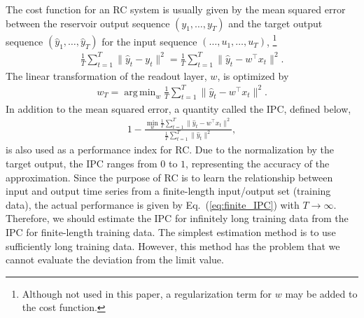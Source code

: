\documentclass{article}
\DeclareMathOperator*{\argmin}{arg\,min}
\begin{document}
The cost function for an RC system is usually given by the mean squared error between the reservoir output sequence $(y_1, \ldots, y_T)$ and the target output sequence $(\hat{y}_1, \ldots, \hat{y}_T)$ for the input sequence $(\ldots, u_1, \ldots, u_T)$, 
\footnote{Although not used in this paper, a regularization term for $w$ may be added to the cost function.}
\begin{align}
 \frac{1}{T} \sum_{t=1}^T \|\hat{y}_t - y_t\|^2 = \frac{1}{T} \sum_{t=1}^T \|\hat{y}_t - w^\top x_t\|^2. 
 \label{eq:RC_cost}
\end{align}
The linear transformation of the readout layer, $w$, is optimized by 
\begin{align}
 w_T = \argmin_w \frac{1}{T} \sum_{t=1}^T \|\hat{y}_t - w^\top x_t\|^2.
 \label{eq:RC_optimize}
\end{align}
In addition to the mean squared error, a quantity called the IPC, defined below, 
\begin{align}
 1 - \frac{\min_w \frac{1}{T} \sum_{t=1}^T \|\hat{y}_t - w^\top x_t\|^2}{\frac{1}{T} \sum_{t=1}^T \|\hat{y}_t\|^2},
 \label{eq:finite_IPC}
\end{align}
is also used as a performance index for RC. 
Due to the normalization by the target output, the IPC ranges from $0$ to $1$, representing the accuracy of the approximation. 
Since the purpose of RC is to learn the relationship between input and output time series from a finite-length input/output set (training data), the actual performance is given by Eq.~(\ref{eq:finite_IPC}) with $T \to \infty$. 
Therefore, we should estimate the IPC for infinitely long training data from the IPC for finite-length training data. 
The simplest estimation method is to use sufficiently long training data. 
However, this method has the problem that we cannot evaluate the deviation from the limit value. 
\end{document}
